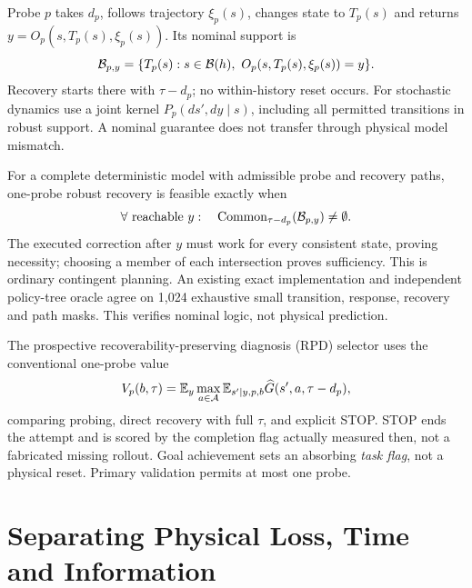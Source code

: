 Probe $p$ takes $d_p$, follows trajectory $\xi_p(s)$, changes state to $T_p(s)$ and returns $y=O_p(s,T_p(s),\xi_p(s))$. Its nominal support is
\begin{equation}
\B_{p,y}=\{T_p(s):s\in\B(h),\ O_p(s,T_p(s),\xi_p(s))=y\}.
\end{equation}
Recovery starts there with $\tau-d_p$; no within-history reset occurs. For stochastic dynamics use a joint kernel $P_p(ds',dy\mid s)$, including all permitted transitions in robust support. A nominal guarantee does not transfer through physical model mismatch.

For a complete deterministic model with admissible probe and recovery paths, one-probe robust recovery is feasible exactly when
\begin{equation}
\forall\text{ reachable }y:\quad
\operatorname{Common}_{\tau-d_p}(\mathcal B_{p,y})\ne\emptyset.\label{eq:criterion}
\end{equation}
The executed correction after $y$ must work for every consistent state, proving necessity; choosing a member of each intersection proves sufficiency. This is ordinary contingent planning. An existing exact implementation and independent policy-tree oracle agree on 1,024 exhaustive small transition, response, recovery and path masks. This verifies nominal logic, not physical prediction.

The prospective recoverability-preserving diagnosis (RPD) selector uses the conventional one-probe value
\begin{equation}
V_p(b,\tau)=\mathbb E_y\max_{a\in\mathcal A}\mathbb E_{s'\mid y,p,b}\widehat G(s',a,\tau-d_p),\label{eq:value}
\end{equation}
comparing probing, direct recovery with full $\tau$, and explicit STOP. STOP ends the attempt and is scored by the completion flag actually measured then, not a fabricated missing rollout. Goal achievement sets an absorbing \emph{task flag}, not a physical reset. Primary validation permits at most one probe.

\section{Separating Physical Loss, Time and Information}
